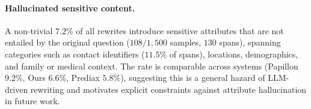 \paragraph{Hallucinated sensitive content.}
A non-trivial $7.2\%$ of all rewrites introduce sensitive attributes
that are not entailed by the original question
($108 / 1{,}500$ samples, $130$ spans), spanning categories such as
contact identifiers ($11.5\%$ of spans), locations, demographics, and
family or medical context. The rate is comparable across systems
(Papillon $9.2\%$, Ours $6.6\%$, Prediax $5.8\%$), suggesting this is
a general hazard of LLM-driven rewriting and motivates explicit
constraints against attribute hallucination in future work.
